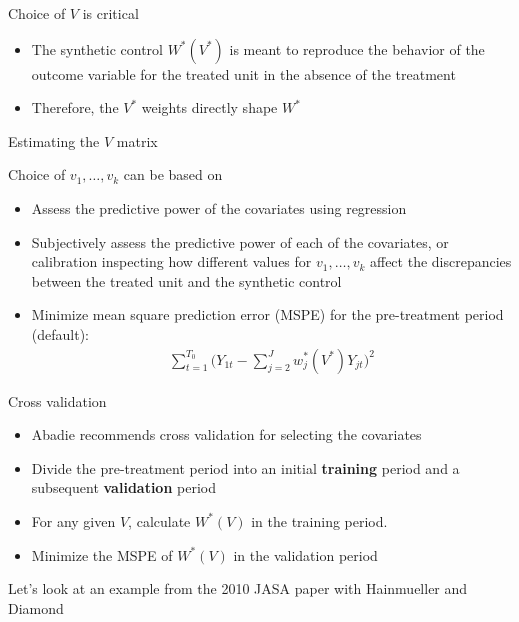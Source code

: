 \documentclass{beamer}
\begin{document}
\begin{frame}{Choice of $V$ is critical}
	
		\begin{itemize}
		\item The synthetic control $W^*(V^*)$ is meant to reproduce the behavior of the outcome variable for the treated unit in the absence of the treatment
		\item Therefore, the $V^*$ weights directly shape $W^*$
		\end{itemize}
\end{frame}

\begin{frame}{Estimating the $V$ matrix}
	
 Choice of $v_1, \dots, v_k$ can be based on
		\begin{itemize}
		\item Assess the predictive power of the covariates using regression
		\item Subjectively assess the predictive power of each of the covariates, or calibration inspecting how different values for $v_1, \dots, v_k$ affect the discrepancies between the treated unit and the synthetic control
		\item Minimize mean square prediction error (MSPE) for the pre-treatment period (default):
			\begin{eqnarray*}
			\sum_{t=1}^{T_0} \bigg(Y_{1t} - \sum_{j=2}^J w_j^*(V^*)Y_{jt} \bigg)^2
			\end{eqnarray*}
		\end{itemize}
\end{frame}

\begin{frame}{Cross validation}

\begin{itemize}
		\item Abadie recommends cross validation for selecting the covariates
		\item Divide the pre-treatment period into an initial \textbf{training} period and a subsequent \textbf{validation} period
		\item For any given $V$, calculate $W^*(V)$ in the training period.
		\item Minimize the MSPE of $W^*(V)$ in the validation period
\end{itemize}

\bigskip

Let's look at an example from the 2010 JASA paper with Hainmueller and Diamond

\end{frame}
\end{document}
